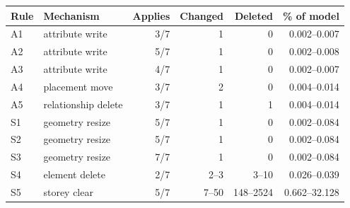 \begin{tabular}{llrrrr}
\toprule
Rule & Mechanism & Applies & Changed & Deleted & \% of model \\
\midrule
A1 & attribute write & 3/7 & 1 & 0 & 0.002--0.007 \\
A2 & attribute write & 5/7 & 1 & 0 & 0.002--0.008 \\
A3 & attribute write & 4/7 & 1 & 0 & 0.002--0.007 \\
A4 & placement move & 3/7 & 2 & 0 & 0.004--0.014 \\
A5 & relationship delete & 3/7 & 1 & 1 & 0.004--0.014 \\
S1 & geometry resize & 5/7 & 1 & 0 & 0.002--0.084 \\
S2 & geometry resize & 5/7 & 1 & 0 & 0.002--0.084 \\
S3 & geometry resize & 7/7 & 1 & 0 & 0.002--0.084 \\
S4 & element delete & 2/7 & 2--3 & 3--10 & 0.026--0.039 \\
S5 & storey clear & 5/7 & 7--50 & 148--2524 & 0.662--32.128 \\
\bottomrule
\end{tabular}